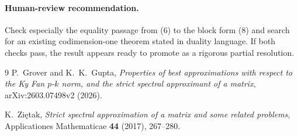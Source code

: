 \documentclass[11pt]{article}
\begin{document}
\paragraph{Human-review recommendation.}
Check especially the equality passage from (6) to the block form (8)
and search for an existing codimension-one theorem stated in duality
language.  If both checks pass, the result appears ready to promote as
a rigorous partial resolution.

\begin{thebibliography}{9}
P.~Grover and K.~K.~Gupta,
\emph{Properties of best approximations with respect to the Ky Fan
\(p\)-\(k\) norm, and the strict spectral approximant of a matrix},
arXiv:2603.07498v2 (2026).

K.~Ziętak,
\emph{Strict spectral approximation of a matrix and some related
problems},
Applicationes Mathematicae \textbf{44} (2017), 267--280.
\end{thebibliography}
\end{document}
